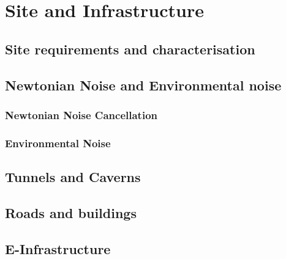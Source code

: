 
\chapter{Site and Infrastructure}
\label{chap:Site}

\section{Site requirements and characterisation}
\label{SiteReq}


\section {Newtonian Noise and Environmental noise}

\subsection {Newtonian Noise Cancellation}
\label{Sec:NewtonianNoise}


\subsection {Environmental Noise}


\section{Tunnels and Caverns}
\label{Sec:TunnelsCaverns}


\section{Roads and buildings}
\label{Sec:RoadsBuildings}



\section{E-Infrastructure}
\label{Sec:EInfrastructure}
